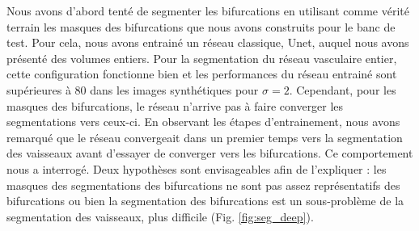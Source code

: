 Nous avons d'abord tenté de segmenter les bifurcations en utilisant comme vérité terrain les masques des bifurcations que nous avons construits pour le banc de test. Pour cela, nous avons entrainé un réseau classique, Unet, auquel nous avons présenté des volumes entiers. Pour la segmentation du réseau vasculaire entier, cette configuration fonctionne bien et les performances du réseau entrainé sont supérieures à 80 \percent{}dans les images synthétiques pour $\sigma=2$. Cependant, pour les masques des bifurcations, le réseau n'arrive pas à faire converger les segmentations vers ceux-ci. En observant les étapes d'entrainement, nous avons remarqué que le réseau convergeait dans un premier temps vers la segmentation des vaisseaux avant d'essayer de converger vers les bifurcations. Ce comportement nous a interrogé. Deux hypothèses sont envisageables afin de l'expliquer : les masques des segmentations des bifurcations ne sont pas assez représentatifs des bifurcations ou bien la segmentation des bifurcations est un sous-problème de la segmentation des vaisseaux, plus difficile (Fig. \ref{fig:seg_deep}).

